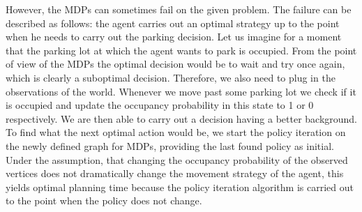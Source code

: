     However, the MDPs can sometimes fail on the given problem. The failure can be described as follows: the agent carries out an optimal strategy up to the point when he needs to carry out the parking decision. Let us imagine for a moment that the parking lot at which the agent wants to park is occupied. From the point of view of the MDPs the optimal decision would be to wait and try once again, which is clearly a suboptimal decision. Therefore, we also need to plug in the observations of the world. Whenever we move past some parking lot we check if it is occupied and update the occupancy probability in this state to 1 or 0 respectively. We are then able to carry out a decision having a better background. To find what the next optimal action would be, we start the policy iteration on the newly defined graph for MDPs, providing the last found policy as initial. Under the assumption, that changing the occupancy probability of the observed vertices does not dramatically change the movement strategy of the agent, this yields optimal planning time because the policy iteration algorithm is carried out to the point when the policy does not change.

